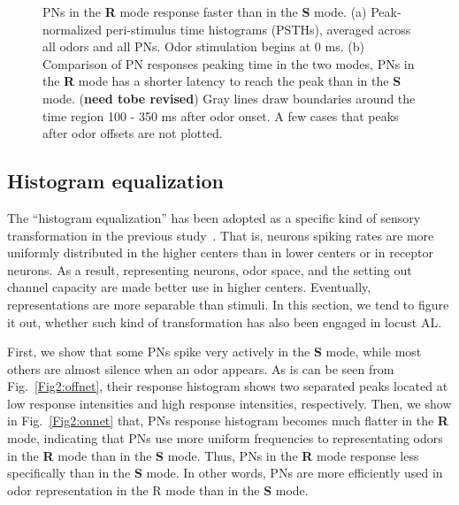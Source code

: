 \documentclass[12pt, a4paper]{article}
\begin{document}
\begin{figure}[htbp]\centering
    \hspace{0.5cm}
    \caption[Peak~eariler]{\label{Figure1:peakEariler} \small PNs in the {\bf R} mode response faster than in the {\bf S} mode.
    (a) Peak-normalized peri-stimulus time histograms (PSTHs), averaged across all odors and all PNs. Odor stimulation begins at 0 ms. (b) Comparison of PN responses peaking time in the two modes, PNs in the {\bf R} mode has a shorter latency to reach the peak than in the {\bf S} mode. ({\bf need tobe revised}) Gray lines draw boundaries around the time region 100 - 350 ms after odor onset. A few cases that peaks after odor offsets are not plotted.
    }
\end{figure}


\subsection{Histogram equalization} \label{Sect:histeq}
The ``histogram equalization'' has been adopted as a specific kind of sensory transformation in the previous study~\citep{}. That is, neurons spiking rates are more uniformly distributed in the higher centers than in lower centers or in receptor neurons. As a result, representing neurons, odor space, and the setting out channel capacity are made better use in higher centers. Eventually, representations are more separable than stimuli. In this section, we tend to figure it out, whether such kind of transformation has also been engaged in locust AL.

First, we show that some PNs spike very actively in the {\bf{S}} mode, while most others are almost silence when an odor appears. As is can be seen from Fig.~\ref{Fig2:offnet}, their response histogram shows two separated peaks located at low response intensities and high response intensities, respectively. Then, we show in Fig.~\ref{Fig2:onnet} that, PNs response histogram becomes much flatter in the {\bf{R}} mode, indicating that PNs use more uniform frequencies to representating odors in the {\bf R} mode than in the {\bf S} mode.
Thus, PNs in the {\bf R} mode response less specifically than in the {\bf S} mode. In other words, PNs are more efficiently used in odor representation in the {\mf R} mode than in the {\bf S} mode.
\end{document}
